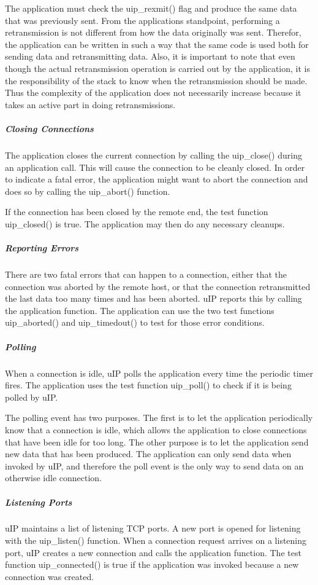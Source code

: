 The application must check the uip\+\_\+rexmit() flag and produce the same data that was previously sent. From the application\textquotesingle{}s standpoint, performing a retransmission is not different from how the data originally was sent. Therefor, the application can be written in such a way that the same code is used both for sending data and retransmitting data. Also, it is important to note that even though the actual retransmission operation is carried out by the application, it is the responsibility of the stack to know when the retransmission should be made. Thus the complexity of the application does not necessarily increase because it takes an active part in doing retransmissions.\hypertarget{a00074_closing}{}\subparagraph{Closing Connections}\label{a00074_closing}
The application closes the current connection by calling the uip\+\_\+close() during an application call. This will cause the connection to be cleanly closed. In order to indicate a fatal error, the application might want to abort the connection and does so by calling the uip\+\_\+abort() function.

If the connection has been closed by the remote end, the test function uip\+\_\+closed() is true. The application may then do any necessary cleanups.\hypertarget{a00074_errors}{}\subparagraph{Reporting Errors}\label{a00074_errors}
There are two fatal errors that can happen to a connection, either that the connection was aborted by the remote host, or that the connection retransmitted the last data too many times and has been aborted. u\+IP reports this by calling the application function. The application can use the two test functions uip\+\_\+aborted() and uip\+\_\+timedout() to test for those error conditions.\hypertarget{a00074_polling}{}\subparagraph{Polling}\label{a00074_polling}
When a connection is idle, u\+IP polls the application every time the periodic timer fires. The application uses the test function uip\+\_\+poll() to check if it is being polled by u\+IP.

The polling event has two purposes. The first is to let the application periodically know that a connection is idle, which allows the application to close connections that have been idle for too long. The other purpose is to let the application send new data that has been produced. The application can only send data when invoked by u\+IP, and therefore the poll event is the only way to send data on an otherwise idle connection.\hypertarget{a00074_listen}{}\subparagraph{Listening Ports}\label{a00074_listen}
u\+IP maintains a list of listening T\+CP ports. A new port is opened for listening with the uip\+\_\+listen() function. When a connection request arrives on a listening port, u\+IP creates a new connection and calls the application function. The test function uip\+\_\+connected() is true if the application was invoked because a new connection was created.


